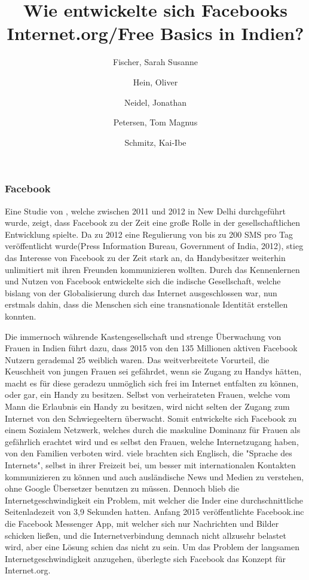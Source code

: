 \documentclass{article}
\title{Wie entwickelte sich Facebooks Internet.org/Free Basics in Indien?}
\author{
  Fischer, Sarah Susanne\\
  \and
  Hein, Oliver\\
  \and
  Neidel, Jonathan\\
  \and
  Petersen, Tom Magnus\\
  \and
  Schmitz, Kai-Ibe\\
}
\begin{document}
\maketitle
\subsubsection {Facebook}
Eine Studie von \textcite{empowermentThroughFacebook}, welche zwischen 2011 und 2012 in New Delhi durchgeführt wurde, zeigt, dass Facebook zu der Zeit eine große Rolle in der gesellschaftlichen Entwicklung spielte. 
\medskip
Da zu 2012 eine Regulierung von bis zu 200 SMS pro Tag veröffentlicht wurde(Press Information Bureau,
Government of India, 2012), stieg das Interesse von Facebook zu der Zeit stark an,
da Handybesitzer weiterhin unlimitiert mit ihren Freunden kommunizieren wollten.
Durch das Kennenlernen und Nutzen von Facebook entwickelte sich die indische Gesellschaft, welche bislang von der Globalisierung durch das Internet ausgeschlossen war, nun erstmals dahin, dass die Menschen sich eine transnationale Identität erstellen konnten.
\medskip

Die immernoch währende Kastengesellschaft und strenge Überwachung von Frauen in Indien führt dazu, dass 2015 von den 135 Millionen aktiven Facebook Nutzern gerademal 25 weiblich waren.
\medskip
Das weitverbreitete Vorurteil, die Keuschheit von jungen Frauen sei gefährdet, wenn sie Zugang zu Handys hätten, macht es für diese geradezu unmöglich sich frei im Internet entfalten zu können, oder gar, ein Handy zu besitzen. Selbst von verheirateten Frauen, welche vom Mann die Erlaubnis ein Handy zu besitzen, wird nicht selten der Zugang zum Internet von den Schwiegeeltern überwacht.
\medskip
Somit entwickelte sich Facebook zu einem Sozialem Netzwerk, welches durch die maskuline Dominanz für Frauen als gefährlich erachtet wird und es selbst den Frauen, welche Internetzugang haben, von den Familien verboten wird.
\medskip
viele brachten sich Englisch, die "Sprache des Internets", 
selbst in ihrer Freizeit bei, um besser mit internationalen Kontakten
kommunizieren zu können und auch ausländische News und Medien zu verstehen, ohne Google Übersetzer benutzen zu müssen.
\medskip
Dennoch blieb die Internetgeschwindigkeit ein Problem, mit welcher die Inder eine durchschnittliche Seitenladezeit von 3,9 Sekunden hatten\autocite{mashable}. Anfang 2015 veröffentlichte Facebook.inc die Facebook Messenger App, mit welcher sich nur Nachrichten und Bilder schicken ließen, und die Internetverbindung demnach nicht allzusehr belastet wird, aber eine Lösung schien das nicht zu sein.
\medskip
Um das Problem der langsamen Internetgeschwindigkeit anzugehen, überlegte sich Facebook das Konzept für Internet.org.


\end{document}
